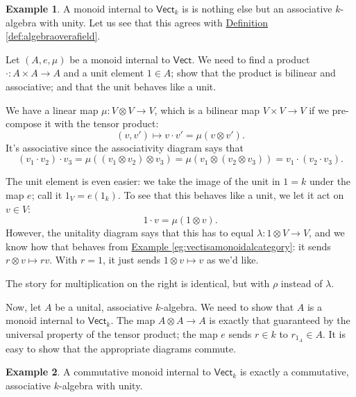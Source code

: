 \documentclass[a4paper,10pt]{scrreprt}
\theoremstyle{definition}
\newtheorem{example}{Example}[section]
\theoremstyle{plain}
\theoremstyle{remark}
\begin{document}
\begin{example}
  \label{eg:algebrasaremonoidsinternaltovect}
  A monoid internal to $\mathsf{Vect}_{k}$ is is nothing else but an associative $k$-algebra with unity. Let us see that this agrees with \hyperref[def:algebraoverafield]{Definition \ref*{def:algebraoverafield}}.

  Let $(A, e, \mu)$ be a monoid internal to $\mathsf{Vect}$. We need to find a product $\cdot\colon A \times A \to A$ and a unit element $1 \in A$; show that the product is bilinear and associative; and that the unit behaves like a unit.

  We have a linear map $\mu\colon V \otimes V \to V$, which is a bilinear map $V \times V \to V$ if we pre-compose it with the tensor product:
  \begin{equation*}
    (v, v') \mapsto v \cdot v' = \mu(v \otimes v').
  \end{equation*}
  It's associative since the associativity diagram says that
  \begin{equation*}
    (v_{1} \cdot v_{2}) \cdot v_{3} = \mu((v_{1} \otimes v_{2}) \otimes v_{3}) = \mu(v_{1} \otimes (v_{2} \otimes v_{3})) = v_{1} \cdot (v_{2} \cdot v_{3}).
  \end{equation*}

  The unit element is even easier: we take the image of the unit in $1=k$ under the map $e$; call it $1_{V} = e(1_{k})$. To see that this behaves like a unit, we let it act on $v \in V$:
  \begin{equation*}
    1 \cdot v = \mu(1 \otimes v).
  \end{equation*}
  However, the unitality diagram says that this has to equal $\lambda\colon 1 \otimes V \to V$, and we know how that behaves from \hyperref[eg:vectisamonoidalcategory]{Example \ref*{eg:vectisamonoidalcategory}}: it sends $r \otimes v \mapsto rv$. With $r = 1$, it just sends $1 \otimes v \mapsto v$ as we'd like. 

  The story for multiplication on the right is identical, but with $\rho$ instead of $\lambda$.

  Now, let $A$ be a unital, associative $k$-algebra. We need to show that $A$ is a monoid internal to $\mathsf{Vect}_{k}$. The map $A \otimes A \to A$ is exactly that guaranteed by the universal property of the tensor product; the map $e$ sends $r \in k$ to $r_{1_{A}} \in A$. It is easy to show that the appropriate diagrams commute.
\end{example}  

\begin{example}
  A commutative monoid internal to $\mathsf{Vect}_{k}$ is exactly a commutative, associative $k$-algebra with unity.
\end{example}
\end{document}
